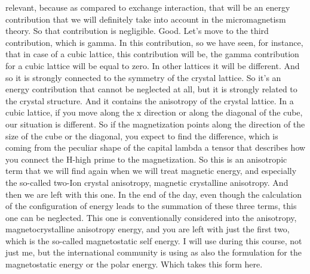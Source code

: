 relevant, because as compared to exchange interaction, that will be an energy contribution that we will definitely take into account in the micromagnetism theory. So that contribution is negligible. Good. Let's move to the third contribution, which is gamma. In this contribution, so we have seen, for instance, that in case of a cubic lattice, this contribution will be, the gamma contribution for a cubic lattice will be equal to zero. In other lattices it will be different. And so it is strongly connected to the symmetry of the crystal lattice. So it's an energy contribution that cannot be neglected at all, but it is strongly related to the crystal structure. And it contains the anisotropy of the crystal lattice. In a cubic lattice, if you move along the x direction or along the diagonal of the cube, our situation is different. So if the magnetization points along the direction of the size of the cube or the diagonal, you expect to find the difference, which is coming from the peculiar shape of the capital lambda a tensor that describes how you connect the H-high prime to the magnetization. So this is an anisotropic term that we will find again when we will treat magnetic energy, and especially the so-called two-Ion crystal anisotropy, magnetic crystalline anisotropy. And then we are left with this one. In the end of the day, even though the calculation of the configuration of energy leads to the summation of these three terms, this one can be neglected. This one is conventionally considered into the anisotropy, magnetocrystalline anisotropy energy, and you are left with just the first two, which is the so-called magnetostatic self energy. I will use during this course, not just me, but the international community is using as also the formulation for the magnetostatic energy or the polar energy. Which takes this form here.
